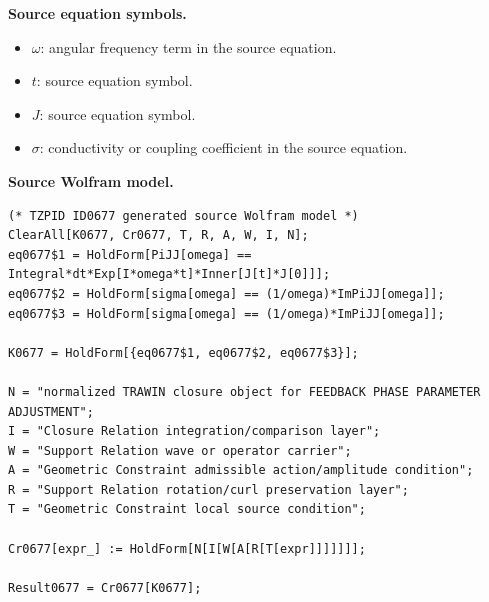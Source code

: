 \begin{minipage}[t]{0.49\linewidth}
\begingroup
\small
\raggedright
\textbf{Source equation symbols.}\par
\begin{itemize}[leftmargin=1.35em,itemsep=1pt,topsep=1pt,parsep=0pt]
    \item $\omega$: angular frequency term in the source equation.
    \item $t$: source equation symbol.
    \item $J$: source equation symbol.
    \item $\sigma$: conductivity or coupling coefficient in the source equation.
\end{itemize}
\endgroup
\end{minipage}\hfill
\begin{minipage}[t]{0.47\linewidth}
\begingroup
\scriptsize
\raggedright
\textbf{Source Wolfram model.}\par
\begin{Verbatim}[fontsize=\tiny,breaklines=true,breakanywhere=true]
(* TZPID ID0677 generated source Wolfram model *)
ClearAll[K0677, Cr0677, T, R, A, W, I, N];
eq0677$1 = HoldForm[PiJJ[omega] == Integral*dt*Exp[I*omega*t]*Inner[J[t]*J[0]]];
eq0677$2 = HoldForm[sigma[omega] == (1/omega)*ImPiJJ[omega]];
eq0677$3 = HoldForm[sigma[omega] == (1/omega)*ImPiJJ[omega]];

K0677 = HoldForm[{eq0677$1, eq0677$2, eq0677$3}];

N = "normalized TRAWIN closure object for FEEDBACK PHASE PARAMETER ADJUSTMENT";
I = "Closure Relation integration/comparison layer";
W = "Support Relation wave or operator carrier";
A = "Geometric Constraint admissible action/amplitude condition";
R = "Support Relation rotation/curl preservation layer";
T = "Geometric Constraint local source condition";

Cr0677[expr_] := HoldForm[N[I[W[A[R[T[expr]]]]]]];

Result0677 = Cr0677[K0677];
\end{Verbatim}
\endgroup
\end{minipage}

